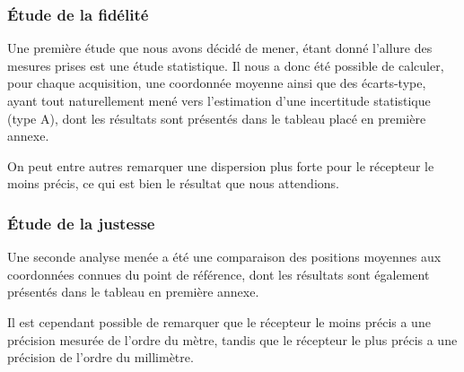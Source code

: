       \subsubsection{Étude de la fidélité}
         Une première étude que nous avons décidé de mener, étant donné l'allure des mesures prises est une étude statistique.
         Il nous a donc été possible de calculer, pour chaque acquisition, une coordonnée moyenne ainsi que des écarts-type, ayant tout naturellement mené vers l'estimation d'une incertitude statistique (type A), dont les résultats sont présentés dans le tableau placé en première annexe.

         On peut entre autres remarquer une dispersion plus forte pour le récepteur le moins précis, ce qui est bien le résultat que nous attendions.

      \subsubsection{Étude de la justesse}
         Une seconde analyse menée a été une comparaison des positions moyennes aux coordonnées connues du point de référence, dont les résultats sont également présentés dans le tableau en première annexe.

         Il est cependant possible de remarquer que le récepteur le moins précis a une précision mesurée de l'ordre du mètre, tandis que le récepteur le plus précis a une précision de l'ordre du millimètre.

